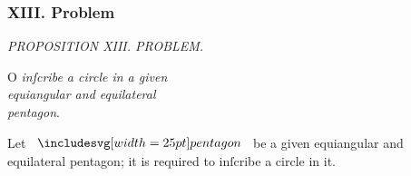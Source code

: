 \documentclass[11pt,preview]{standalone}
\begin{document}
\subsubsection{XIII. Problem}

\begin{minipage}[t]{0.43\textwidth}
    \vspace{20pt}
    
\end{minipage}%
\hfill
\begin{minipage}[t]{0.54\textwidth}
    \begin{center}
        \textit{PROPOSITION XIII. PROBLEM.}\label{book4pr13} \\
    \end{center}

    \hfill

    \begin{center}
        \raggedright \lettrine[lines=3, loversize=1, nindent=0pt]{}{}O \textit{inſcribe a circle in a given\\ equiangular and equilateral\\ pentagon}.
    \end{center}
\end{minipage}%

\hfill

\hfill

\raggedright Let $\img{pentagon}$ be a given equiangular and equilateral pentagon; it is required to inſcribe a circle in it.

\hfill
\end{document}
